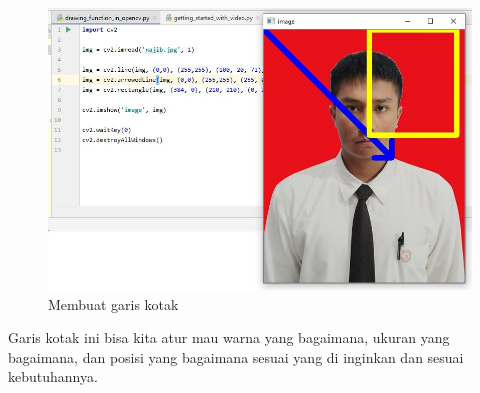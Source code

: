 \newpage
\begin{figure}[ht]
\centering
\includegraphics[scale=0.5]{figures/2,11.jpg}
\caption{Membuat garis kotak}
\label{contoh}
\end{figure}

Garis kotak ini bisa kita atur mau warna yang bagaimana, ukuran yang bagaimana, dan posisi yang bagaimana sesuai yang di inginkan dan sesuai kebutuhannya.

\newpage
